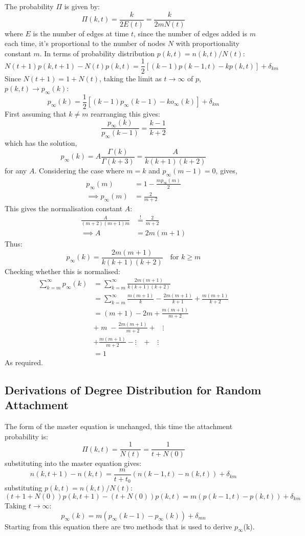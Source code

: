 \documentclass[twoside]{article}
\begin{document}
The probability $\Pi$ is given by:
\[
\Pi(k,t) = \frac{k}{2E(t)} = \frac{k}{2mN(t)}
\]
where $E$ is the number of edges at time $t$, since the number of edges added is $m$ each time, it's proportional to the number of nodes $N$ with proportionality constant $m$. In terms of probability distribution $p(k,t) = n(k,t)/N(t)$:
\[
N(t+1)p(k,t+1) - N(t) p(k,t) = \frac{1}{2} \left[ (k-1) p(k-1,t) - k p(k,t) \right] + \delta_{km}
\]
Since $N(t+1) = 1+N(t)$, taking the limit as $t \to \infty$ of $p$, $p(k,t) \to p_{\infty} (k)$:
\[
p_{\infty}(k) = \frac{1}{2} \left[(k-1) p_{\infty} (k-1) - k o_{\infty}(k) \right] +\delta_{km}
\]
First assuming that $k \neq m$ rearranging this gives:
\[
\frac{p_{\infty}(k) }{p_{\infty}(k-1)} = \frac{k-1}{k+2}
\]
which has the solution,
\[
p_{\infty}(k)=A\frac{\Gamma (k)}{\Gamma (k+3) } = \frac{A}{k(k+1)(k+2)}
\]
for any $A$. Considering the case where $m=k$ and $p_{\infty} (m-1) =0$, gives,
\begin{align*}
p_{\infty}(m) & = 1 - \frac{m p_{\infty}(m)}{2} \\
\implies p_{\infty}(m) & = \frac{2}{m+2}
\end{align*}
This gives the normalisation constant $A$:
\begin{align*}
\frac{A}{(m+2)(m+1)m} & \overset{!}{=} \frac{2}{m+2} \\
\implies A &= 2m(m+1)
\end{align*}
Thus:
\[
\boxed{
p_{\infty} (k) = \frac{2m(m+1)}{k(k+1)(k+2)} \quad \text{for } k \geq m}
\]
Checking whether this is normalised:
\begin{align*}
\sum_{k=m}^{\infty}p_{\infty}(k)&= \sum_{k=m}^{\infty}  \frac{2m(m+1)}{k(k+1)(k+2)} \\
&= \sum_{k=m}^{\infty} \frac{m(m+1)}{k} - \frac{2m(m+1)}{k+1} +\frac{m(m+1)}{k+2} \\
&= (m+1) - 2m + \frac{m(m+1)}{m+2}\\
&+ \; m \;  - \frac{2m(m+1)}{m+2} + \;\;\; \vdots \\
&+  \frac{m(m+1)}{m+2} - \vdots\;\;\; + \;\;\; \vdots \\
&= 1
\end{align*}
As required.
\subsection{Derivations of Degree Distribution for Random Attachment}
The form of the master equation is unchanged, this time the attachment probability is:
\[
\Pi (k,t) = \frac{1}{N(t)} = \frac{1}{t+N(0)}
\]
substituting into the master equation gives:
\[
n(k,t+1) - n(k,t) = \frac{m}{t+t_0} (n(k-1, t) - n(k,t) ) + \delta_{km}
\]
substituting $p(k,t)=n(k,t)/N(t)$:
\[
(t+1+N(0)) p(k,t+1) - (t+N(0)) p(k, t) = m ( p(k-1, t) - p(k,t) ) +\delta_{km}
\]
Taking $t \to \infty$:
\begin{equation}
p_{\infty}(k)=m ( p_{\infty}(k-1)- p_{\infty}(k)) +\delta_{mn}
\end{equation}
Starting from this equation there are two methods that is used to derive $p_{\infty}$(k).
\end{document}
